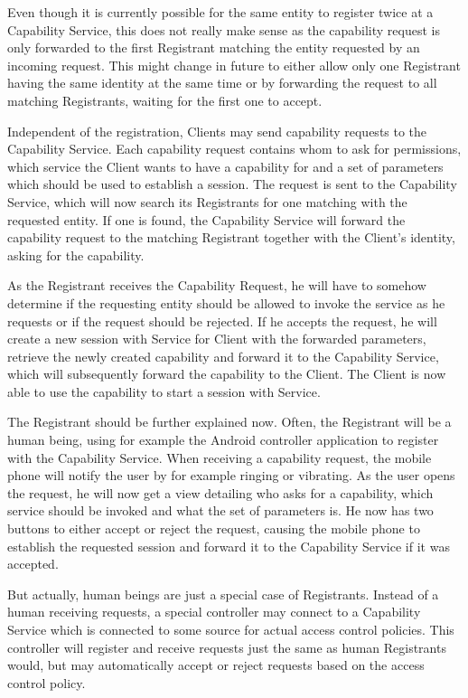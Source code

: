 Even though it is currently possible for the same entity to register twice at a Capability Service, this does not really make sense as the capability request is only forwarded to the first Registrant matching the entity requested by an incoming request.
This might change in future to either allow only one Registrant having the same identity at the same time or by forwarding the request to all matching Registrants, waiting for the first one to accept.

Independent of the registration, Clients may send capability requests to the Capability Service.
Each capability request contains whom to ask for permissions, which service the Client wants to have a capability for and a set of parameters which should be used to establish a session.
The request is sent to the Capability Service, which will now search its Registrants for one matching with the requested entity.
If one is found, the Capability Service will forward the capability request to the matching Registrant together with the Client's identity, asking for the capability.

As the Registrant receives the Capability Request, he will have to somehow determine if the requesting entity should be allowed to invoke the service as he requests or if the request should be rejected.
If he accepts the request, he will create a new session with Service for Client with the forwarded parameters, retrieve the newly created capability and forward it to the Capability Service, which will subsequently forward the capability to the Client.
The Client is now able to use the capability to start a session with Service.

\medskip

The Registrant should be further explained now.
Often, the Registrant will be a human being, using for example the Android controller application to register with the Capability Service.
When receiving a capability request, the mobile phone will notify the user by for example ringing or vibrating.
As the user opens the request, he will now get a view detailing who asks for a capability, which service should be invoked and what the set of parameters is.
He now has two buttons to either accept or reject the request, causing the mobile phone to establish the requested session and forward it to the Capability Service if it was accepted.

But actually, human beings are just a special case of Registrants.
Instead of a human receiving requests, a special controller may connect to a Capability Service which is connected to some source for actual access control policies.
This controller will register and receive requests just the same as human Registrants would, but may automatically accept or reject requests based on the access control policy.

